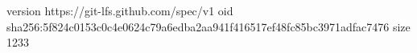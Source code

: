 version https://git-lfs.github.com/spec/v1
oid sha256:5f824c0153c0c4e0624c79a6edba2aa941f416517ef48fc85bc3971adfac7476
size 1233
